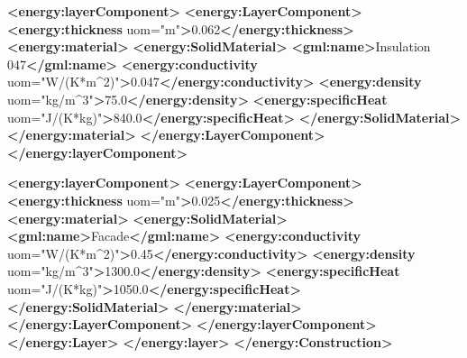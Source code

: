 \documentclass[a4paper,12pt]{article}
\newenvironment{Shaded}{}{}
\newcommand{\KeywordTok}[1]{\textcolor[rgb]{0.00,0.44,0.13}{\textbf{{#1}}}}
\newcommand{\StringTok}[1]{\textcolor[rgb]{0.25,0.44,0.63}{{#1}}}
\newcommand{\OtherTok}[1]{\textcolor[rgb]{0.00,0.44,0.13}{{#1}}}
\newcommand{\NormalTok}[1]{{#1}}
\begin{document}
\begin{Shaded}
\begin{Highlighting}[]
            \KeywordTok{<energy:layerComponent>}
                \KeywordTok{<energy:LayerComponent>}
                    \KeywordTok{<energy:thickness}\OtherTok{ uom=}\StringTok{"m"}\KeywordTok{>}\NormalTok{0.062}\KeywordTok{</energy:thickness>}
                    \KeywordTok{<energy:material>}
                        \KeywordTok{<energy:SolidMaterial>}
                            \KeywordTok{<gml:name>}\NormalTok{Insulation 047}\KeywordTok{</gml:name>}
                            \KeywordTok{<energy:conductivity}\OtherTok{ uom=}\StringTok{"W/(K*m^2)"}\KeywordTok{>}\NormalTok{0.047}\KeywordTok{</energy:conductivity>}
                            \KeywordTok{<energy:density}\OtherTok{ uom=}\StringTok{"kg/m^3"}\KeywordTok{>}\NormalTok{75.0}\KeywordTok{</energy:density>}
                            \KeywordTok{<energy:specificHeat}\OtherTok{ uom=}\StringTok{"J/(K*kg)"}\KeywordTok{>}\NormalTok{840.0}\KeywordTok{</energy:specificHeat>}
                        \KeywordTok{</energy:SolidMaterial>}
                    \KeywordTok{</energy:material>}
                \KeywordTok{</energy:LayerComponent>}
            \KeywordTok{</energy:layerComponent>}

            \KeywordTok{<energy:layerComponent>}
                \KeywordTok{<energy:LayerComponent>}
                    \KeywordTok{<energy:thickness}\OtherTok{ uom=}\StringTok{"m"}\KeywordTok{>}\NormalTok{0.025}\KeywordTok{</energy:thickness>}
                    \KeywordTok{<energy:material>}
                        \KeywordTok{<energy:SolidMaterial>}
                            \KeywordTok{<gml:name>}\NormalTok{Facade}\KeywordTok{</gml:name>}
                            \KeywordTok{<energy:conductivity}\OtherTok{ uom=}\StringTok{"W/(K*m^2)"}\KeywordTok{>}\NormalTok{0.45}\KeywordTok{</energy:conductivity>}
                            \KeywordTok{<energy:density}\OtherTok{ uom=}\StringTok{"kg/m^3"}\KeywordTok{>}\NormalTok{1300.0}\KeywordTok{</energy:density>}
                            \KeywordTok{<energy:specificHeat}\OtherTok{ uom=}\StringTok{"J/(K*kg)"}\KeywordTok{>}\NormalTok{1050.0}\KeywordTok{</energy:specificHeat>}
                        \KeywordTok{</energy:SolidMaterial>}
                    \KeywordTok{</energy:material>}
                \KeywordTok{</energy:LayerComponent>}
            \KeywordTok{</energy:layerComponent>}
        \KeywordTok{</energy:Layer>}
    \KeywordTok{</energy:layer>}
\KeywordTok{</energy:Construction>}
\end{Highlighting}
\end{Shaded}
\end{document}
